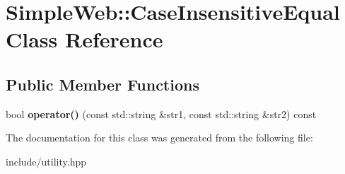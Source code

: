 \hypertarget{classSimpleWeb_1_1CaseInsensitiveEqual}{}\section{Simple\+Web\+:\+:Case\+Insensitive\+Equal Class Reference}
\label{classSimpleWeb_1_1CaseInsensitiveEqual}
\subsection*{Public Member Functions}
\begin{DoxyCompactItemize}
\item 
bool {\bfseries operator()} (const std\+::string \&str1, const std\+::string \&str2) const \hypertarget{classSimpleWeb_1_1CaseInsensitiveEqual_a67e3e8cdd51d2ef5f0daa8906633548c}{}\label{classSimpleWeb_1_1CaseInsensitiveEqual_a67e3e8cdd51d2ef5f0daa8906633548c}

\end{DoxyCompactItemize}


The documentation for this class was generated from the following file\+:\begin{DoxyCompactItemize}
\item 
include/utility.\+hpp\end{DoxyCompactItemize}
